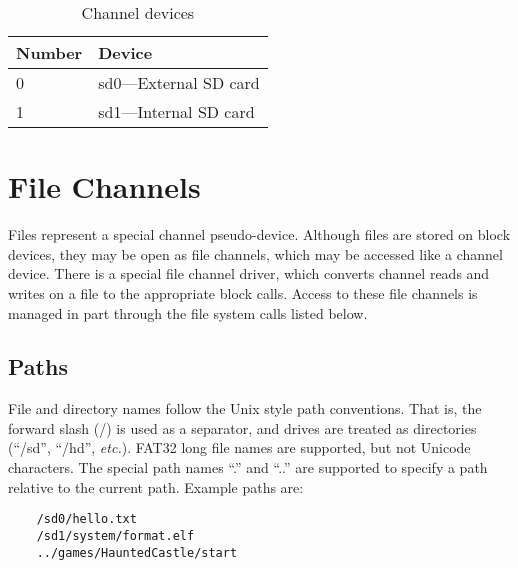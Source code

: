 \begin{table}
    \begin{center}
        \begin{tabular}{|l||l|} \hline
            Number & Device \\ \hline\hline
            0 & sd0---External SD card \\ \hline
            1 & sd1---Internal SD card \\ \hline
        \end{tabular}
    \end{center}
    \caption{Channel devices}
    \label{tab:block_devs}
\end{table}

\section{File Channels}
Files represent a special channel pseudo-device. Although files are stored on block devices, they may be open as file channels, which may be accessed like a channel device. There is a special file channel driver, which converts channel reads and writes on a file to the appropriate block calls. Access to these file channels is managed in part through the file system calls listed below.

\subsection*{Paths}
File and directory names follow the Unix style path conventions.
That is, the forward slash (/) is used as a separator, and drives are treated as directories (``/sd'', ``/hd'', {\it etc.}).
FAT32 long file names are supported, but not Unicode characters.
The special path names ``.'' and ``..'' are supported to specify a path relative to the current path. Example paths are:

\begin{verbatim}
    /sd0/hello.txt
    /sd1/system/format.elf
    ../games/HauntedCastle/start	
\end{verbatim}

